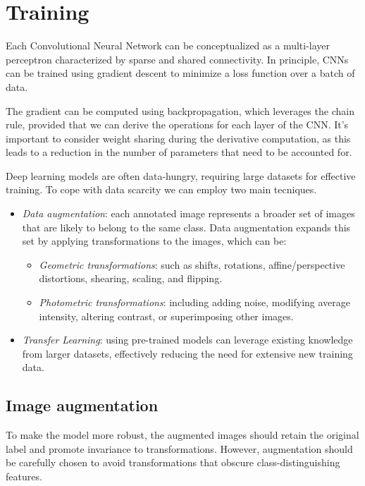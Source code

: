 \section{Training}

Each Convolutional Neural Network can be conceptualized as a multi-layer perceptron characterized by sparse and shared connectivity. 
In principle, CNNs can be trained using gradient descent to minimize a loss function over a batch of data.

The gradient can be computed using backpropagation, which leverages the chain rule, provided that we can derive the operations for each layer of the CNN. 
It's important to consider weight sharing during the derivative computation, as this leads to a reduction in the number of parameters that need to be accounted for.

Deep learning models are often data-hungry, requiring large datasets for effective training. 
To cope with data scarcity we can employ two main tecniques. 
\begin{itemize} 
    \item \textit{Data augmentation}: each annotated image represents a broader set of images that are likely to belong to the same class. 
        Data augmentation expands this set by applying transformations to the images, which can be: 
        \begin{itemize} 
            \item \textit{Geometric transformations}: such as shifts, rotations, affine/perspective distortions, shearing, scaling, and flipping.
            \item \textit{Photometric transformations}: including adding noise, modifying average intensity, altering contrast, or superimposing other images.
        \end{itemize}
    \item \textit{Transfer Learning}: using pre-trained models can leverage existing knowledge from larger datasets, effectively reducing the need for extensive new training data.
\end{itemize} 

\subsection{Image augmentation}
To make the model more robust, the augmented images should retain the original label and promote invariance to transformations. 
However, augmentation should be carefully chosen to avoid transformations that obscure class-distinguishing features.

